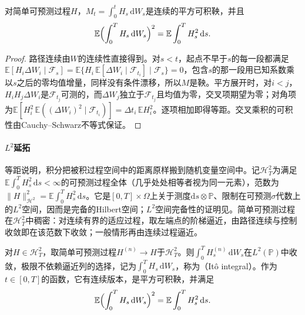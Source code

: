 \begin{lemma}[简单过程的Itô等距]
  \label{lem:ctsp-simple-isometry}
  对简单可预测过程$H$，$M_t=\int_0^tH_s\,\mathrm dW_s$是连续的平方可积鞅，并且
  \[
    \mathbb E\Bigl(\int_0^TH_s\,\mathrm dW_s\Bigr)^2=\mathbb E\int_0^TH_s^2\,\mathrm ds .
  \]
\end{lemma}

\begin{proof}
路径连续由$W$的连续性直接得到。对$s<t$，起点不早于$s$的每一段都满足$\mathbb E[H_i\Delta W_i\mid\mathcal F_s]=\mathbb E\{H_i\,\mathbb E[\Delta W_i\mid\mathcal F_{t_i}]\mid\mathcal F_s\}=0$，包含$s$的那一段用已知系数乘以$s$之后的零均值增量，同样没有条件漂移，所以$M$是鞅。平方展开时，对$i<j$，$H_iH_j\Delta W_i$是$\mathcal F_{t_j}$可测的，而$\Delta W_j$独立于$\mathcal F_{t_j}$且均值为零，交叉项期望为零；对角项为$\mathbb E[H_i^2\,\mathbb E((\Delta W_i)^2\mid\mathcal F_{t_i})]=\Delta t_i\,\mathbb EH_i^2$。逐项相加即得等距。交叉乘积的可积性由Cauchy--Schwarz不等式保证。
\end{proof}

\paragraph{$L^2$延拓}
等距说明，积分把被积过程空间中的距离原样搬到随机变量空间中。记$\mathcal H^2_T$为满足$\mathbb E\int_0^TH_s^2\,\mathrm ds<\infty$的可预测过程全体（几乎处处相等者视为同一元素），范数为$\|H\|^2_{\mathcal H^2}=\mathbb E\int_0^TH_s^2\,\mathrm ds$。它是$[0,T]\times\Omega$上关于测度$\mathrm ds\otimes\mathbb P$、限制在可预测$\sigma$代数上的$L^2$空间，因而是完备的Hilbert空间；$L^2$空间完备性的证明见。简单可预测过程在$\mathcal H^2_T$中稠密：对连续有界的适应过程，取左端点的阶梯逼近，由路径连续与控制收敛即在该范数下收敛；一般情形再由连续过程逼近。

\begin{theorem}[Itô积分]
  \label{thm:ctsp-ito-integral}
  对$H\in\mathcal H^2_T$，取简单可预测过程$H^{(n)}\to H$于$\mathcal H^2_T$。则$\int_0^TH^{(n)}_s\,\mathrm dW_s$在$L^2(\mathbb P)$中收敛，极限不依赖逼近列的选择，记为$\int_0^TH_s\,\mathrm dW_s$，称为（Itô integral）。作为$t\in[0,T]$的函数，它有连续版本，是平方可积鞅，并满足
  \begin{equation}
    \mathbb E\Bigl(\int_0^TH_s\,\mathrm dW_s\Bigr)^2=\mathbb E\int_0^TH_s^2\,\mathrm ds .
    \label{eq:ctsp-ito-isometry}
  \end{equation}
\end{theorem}

